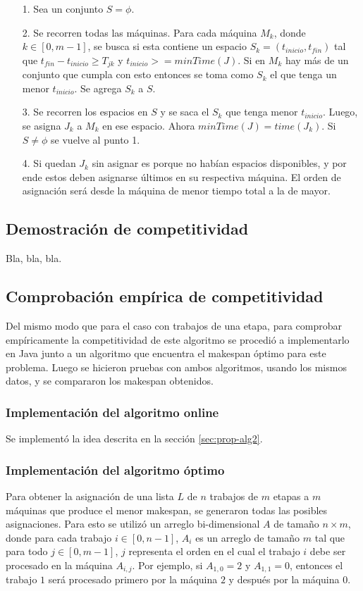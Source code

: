 \documentclass[12pt,letterpaper]{article}
\begin{document}
\begin{itemize}
\item[1.] Sea un conjunto $S = \phi$.
\item[2.] Se recorren todas las máquinas. Para cada máquina $M_{k}$, donde $k \in [0, m-1]$, se busca si esta contiene un espacio $S_{k} = (t_{inicio}, t_{fin})$ tal que $t_{fin} - t_{inicio} \geq T_{jk}$ y $t_{inicio} >= minTime(J)$. Si en $M_{k}$ hay más de un conjunto que cumpla con esto entonces se toma como $S_{k}$ el que tenga un menor $t_{inicio}$. Se agrega $S_{k}$ a $S$.
\item[3.] Se recorren los espacios en $S$ y se saca el $S_{k}$ que tenga menor $t_{inicio}$. Luego, se asigna $J_{k}$ a $M_{k}$ en ese espacio. Ahora $minTime(J) = time(J_{k})$. Si $S \not = \phi$ se vuelve al punto 1.
\item[4.] Si quedan $J_{k}$ sin asignar es porque no habían espacios disponibles, y por ende estos deben asignarse últimos en su respectiva máquina. El orden de asignación será desde la máquina de menor tiempo total a la de mayor.
\end{itemize}
	
\subsection{Demostración de competitividad}
Bla, bla, bla.

\subsection{Comprobación empírica de competitividad}
Del mismo modo que para el caso con trabajos de una etapa, para comprobar empíricamente la competitividad de este algoritmo se procedió a implementarlo en Java junto a un algoritmo que encuentra el makespan óptimo para este problema. Luego se hicieron pruebas con ambos algoritmos, usando los mismos datos, y se compararon los makespan obtenidos.

\subsubsection{Implementación del algoritmo online}
Se implementó la idea descrita en la sección \ref{sec:prop-alg2}.

\subsubsection{Implementación del algoritmo óptimo}
Para obtener la asignación de una lista $L$ de $n$ trabajos de $m$ etapas a $m$ máquinas que produce el menor makespan, se generaron todas las posibles asignaciones. Para esto se utilizó un arreglo bi-dimensional $A$ de tamaño $n \times m$, donde para cada trabajo $i \in [0, n-1]$, $A_{i}$ es un arreglo de tamaño $m$ tal que para todo $j \in [0, m-1]$, $j$ representa el orden en el cual el trabajo $i$ debe ser procesado en la máquina $A_{i,j}$. Por ejemplo, si $A_{1,0} = 2$ y $A_{1,1} = 0$, entonces el trabajo $1$ será procesado primero por la máquina $2$ y después por la máquina $0$. \\
\end{document}

